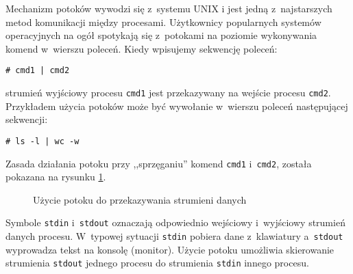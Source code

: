 Mechanizm potoków wywodzi się z~systemu UNIX i jest jedną z~najstarszych metod
komunikacji między procesami. Użytkownicy popularnych systemów operacyjnych na
ogół spotykają się z~potokami na poziomie wykonywania komend w~wierszu poleceń.
Kiedy wpisujemy sekwencję poleceń:
\begin{lstlisting}[style=MyBashStyle]
# cmd1 | cmd2
\end{lstlisting}
strumień wyjściowy procesu \texttt{cmd1} jest przekazywany na wejście procesu
\texttt{cmd2}. Przykładem użycia potoków może być wywołanie w~wierszu poleceń
następującej sekwencji:
\begin{lstlisting}[style=MyBashStyle]
# ls -l | wc -w
\end{lstlisting}

Zasada działania potoku przy ,,sprzęganiu'' komend \texttt{cmd1}
i~\texttt{cmd2}, została pokazana na rysunku \ref{fig:1CP3G}.
\begin{figure}[!h]
  \centering
  \caption{Użycie potoku do przekazywania strumieni danych}
  \label{fig:1CP3G}
\end{figure}
Symbole \texttt{stdin} i~\texttt{stdout} oznaczają odpowiednio wejściowy
i~wyjściowy strumień danych procesu. W~typowej sytuacji \texttt{stdin} pobiera
dane z~klawiatury a~\texttt{stdout} wyprowadza tekst na konsolę (monitor).
Użycie potoku umożliwia skierowanie strumienia \texttt{stdout} jednego procesu
do strumienia \texttt{stdin} innego procesu.


